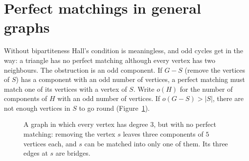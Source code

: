 \section{Perfect matchings in general graphs}\label{sec:tutte}

Without bipartiteness Hall's condition is meaningless, and odd cycles get in the way: a triangle has no perfect matching
although every vertex has two neighbours. The obstruction is an odd component. If $G-S$ (remove the vertices of $S$) has a
component with an odd number of vertices, a perfect matching must match one of its vertices with a vertex of $S$. Write $o(H)$ for
the number of components of $H$ with an odd number of vertices. If $o(G-S)>|S|$, there are not enough vertices in $S$ to go round
(Figure~\ref{fig:sylvester}).

\begin{figure}[ht]
\centering
{}
\caption{A graph in which every vertex has degree $3$, but with no perfect matching: removing the vertex $s$ leaves three
components of $5$ vertices each, and $s$ can be matched into only one of them. Its three edges at $s$ are bridges.}
\label{fig:sylvester}
\end{figure}


